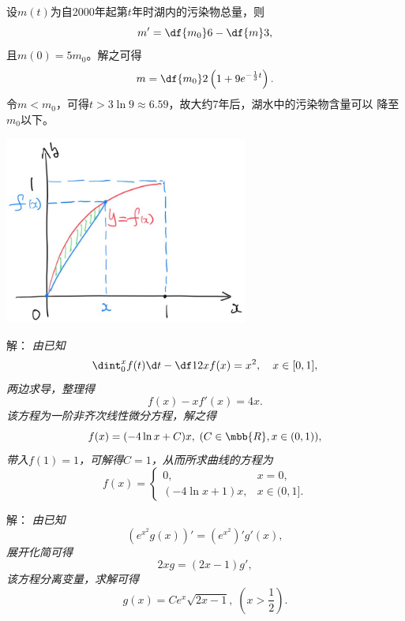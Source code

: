 \begin{frame}
	\linespread{1.5}
	\small\it
	
	设$m(t)$为自2000年起第$t$年时湖内的污染物总量，则
	$$m'=\df{m_0}6-\df{m}3,$$
	且$m(0)=5m_0$。解之可得
	$$m=\df{m_0}2\left(1+9e^{-\frac13t}\right).$$
	令$m<m_0$，可得$t>3\ln9\approx6.59$，故大约7年后，湖水中的污染物含量可以
	降至$m_0$以下。\fin
\end{frame}

\begin{frame}
	\linespread{1.5}
	
	\begin{center}
		\includegraphics[width=0.6\textwidth]{./images/ch7/fxx2.jpg}
	\end{center}
\end{frame}

\begin{frame}
	\linespread{1.5}	
	\small 解：\it
	由已知
	$$\dint_0^xf(t)\d t-\df12xf(x)=x^2,\quad x\in[0,1],$$
	两边求导，整理得
	$$f(x)-xf'(x)=4x.$$
	该方程为一阶非齐次线性微分方程，解之得
	$$f(x)=(-4\ln x+C)x,\;(C\in\mbb{R},x\in(0,1)),$$
	带入$f(1)=1$，可解得$C=1$，从而所求曲线的方程为
	$$f(x)=\left\{\begin{array}{ll}
		0,& x=0,\\
		(-4\ln x+1)x,& x\in(0,1].
	\end{array}\right.$$
	\fin
\end{frame}

\begin{frame}
	\linespread{1.5}
	
	\bigskip
	
	\small 解：\it
	由已知
	$$(e^{x^2}g(x))'=(e^{x^2})'g'(x),$$
	展开化简可得
	$$2xg=(2x-1)g',$$
	该方程分离变量，求解可得
	$$g(x)=Ce^x\sqrt{2x-1},\;(x>\frac12).$$
	\fin
\end{frame}


